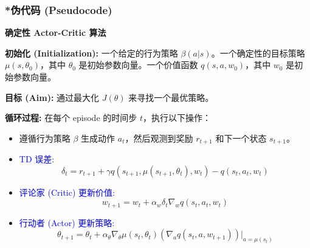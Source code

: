\documentclass{article}
\begin{document}
\subsubsection*{*伪代码 (Pseudocode)}
\begin{framed}
\noindent\textbf{确定性 Actor-Critic 算法}

\vspace{1em} %

\noindent\textbf{初始化 (Initialization):}
一个给定的行为策略 $\beta(a|s)$。一个确定性的目标策略 $\mu(s, \theta_0)$，其中 $\theta_0$ 是初始参数向量。一个价值函数 $q(s,a,w_0)$，其中 $w_0$ 是初始参数向量。

\noindent\textbf{目标 (Aim):}
通过最大化 $J(\theta)$ 来寻找一个最优策略。

\noindent\textbf{循环过程:}
在每个 episode 的时间步 $t$，执行以下操作：
\begin{itemize}
    \item 遵循行为策略 $\beta$ 生成动作 $a_t$，然后观测到奖励 $r_{t+1}$ 和下一个状态 $s_{t+1}$。
    \item \textcolor{blue}{TD 误差:}
    \[ \delta_t = r_{t+1} + \gamma q(s_{t+1}, \mu(s_{t+1}, \theta_t), w_t) - q(s_t, a_t, w_t) \]
    \item \textcolor{blue}{评论家 (Critic) 更新价值:}
    \[ w_{t+1} = w_t + \alpha_w \delta_t \nabla_w q(s_t, a_t, w_t) \]
    \item \textcolor{blue}{行动者 (Actor) 更新策略:}
    \[ \theta_{t+1} = \theta_t + \alpha_{\theta} \nabla_{\theta} \mu(s_t, \theta_t)(\nabla_a q(s_t, a, w_{t+1}))|_{a=\mu(s_t)} \]
\end{itemize}
\end{framed}
\end{document}
